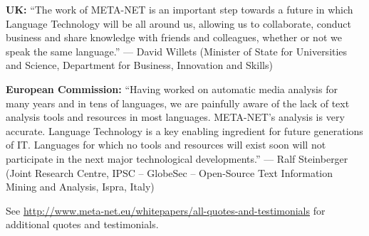 \documentclass[10pt, plain]{../../metanetpaper}
\begin{document}




\medskip \textbf{UK:} ``The work of META-NET is an important step towards a future in which Language Technology will be all around us, allowing us to collaborate, conduct business and share knowledge with friends and colleagues, whether or not we speak the same language.'' --- David Willets (Minister of State for Universities and Science, Department for Business, Innovation and Skills)

\medskip \textbf{European Commission:} ``Having worked on automatic media analysis for many years and in tens of languages, we are painfully aware of the lack of text analysis tools and resources in most languages. META-NET's analysis is very accurate. Language Technology is a key enabling ingredient for future generations of IT. Languages for which no tools and resources will exist soon will not participate in the next major technological developments.'' --- Ralf Steinberger (Joint Research Centre, 
IPSC -- GlobeSec -- Open-Source Text Information Mining and Analysis, Ispra, Italy)

\smallskip \centerline{\small See \url{http://www.meta-net.eu/whitepapers/all-quotes-and-testimonials} for additional quotes and testimonials.}

~

\vfill

\centerline{\normalsize{}}
\end{document}
